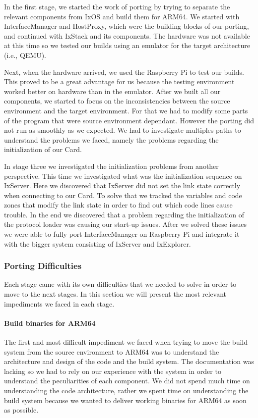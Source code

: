 In the first stage, we started the work of porting by trying to separate the
relevant components from IxOS and build them for ARM64. We started with
InterfaceManager and HostProxy, which were the building blocks of our porting,
and continued with IxStack and its components. The hardware was not available
at this time so we tested our builds using an emulator for the target
architecture (i.e., QEMU).

Next, when the hardware arrived, we used the Raspberry Pi to test our builds.
This proved to be a great advantage for us because the testing environment
worked better on hardware than in the emulator. After we built all our
components, we started to focus on the inconsistencies between the source
environment and the target environment. For that we had to modify some parts of
the program that were source environment dependant. However the porting did not
run as smoothly as we expected. We had to investigate multiples paths to
understand the problems we faced, namely the problems regarding the
initialization of our Card.

In stage three we investigated the initialization problems from another
perspective. This time we investigated what was the initialization sequence on
IxServer. Here we discovered that IxServer did not set the link state correctly
when connecting to our Card. To solve that we tracked the variables and code
zones that modify the link state in order to find out which code lines cause
trouble. In the end we discovered that a problem regarding the initialization
of the protocol loader was causing our start-up issues. After we solved
these issues we were able to fully port InterfaceManager on Raspberry Pi and
integrate it with the bigger system consisting of IxServer and IxExplorer.

\subsubsection{Porting Difficulties}

Each stage came with its own difficulties that we needed to solve in order to
move to the next stages. In this section we will present the most relevant
impediments we faced in each stage.

\paragraph{Build binaries for ARM64}

The first and most difficult impediment we faced when trying to move the build
system from the source environment to ARM64 was to understand the architecture
and design of the code and the build system. The documentation was lacking so
we had to rely on our experience with the system in order to understand the
peculiarities of each component. We did not spend much time on understanding the
code architecture, rather we spent time on understanding the build system
because we wanted to deliver working binaries for ARM64 as soon as possible.

